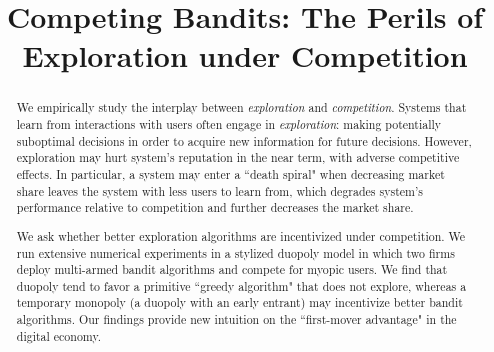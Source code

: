 \documentclass[letterpaper]{article}
\theoremstyle{definition}
\begin{document}


\title{Competing Bandits: The Perils of Exploration under Competition}

\maketitle


\begin{abstract}
We empirically study the interplay between \textit{exploration} and \textit{competition}. Systems that learn from interactions with users
often engage in \emph{exploration}: making potentially suboptimal decisions in order to acquire new information for future decisions. However, exploration may hurt system's reputation in the near term, with adverse competitive effects. In particular, a system may enter a ``death spiral" when decreasing market share leaves the system with less users to learn from, which degrades system's performance relative to competition and further decreases the market share.

We ask whether better exploration algorithms are incentivized under competition. We run extensive numerical experiments in a stylized duopoly model in which two firms deploy multi-armed bandit algorithms and compete for myopic users.  We find that duopoly  tend to favor a primitive ``greedy algorithm" that does not explore, whereas a temporary monopoly (a duopoly with an early entrant) may incentivize better bandit algorithms. Our findings provide new intuition on the ``first-mover advantage" in the digital economy.
\end{abstract}
\end{document}

